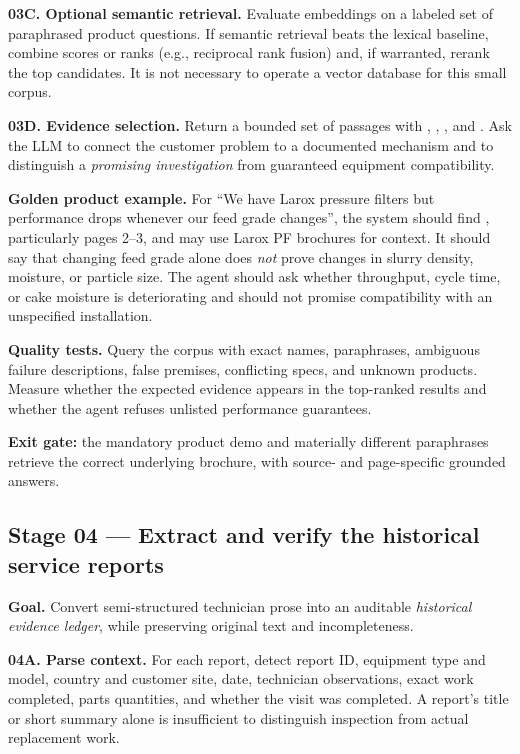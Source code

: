 \documentclass[11pt,a4paper]{article}
\DeclareRobustCommand{\code}[1]{{\ttfamily\small\detokenize{#1}}}
\begin{document}
\textbf{03C. Optional semantic retrieval.} Evaluate embeddings on a labeled set of paraphrased product questions. If semantic retrieval beats the lexical baseline, combine scores or ranks (e.g., reciprocal rank fusion) and, if warranted, rerank the top candidates. It is not necessary to operate a vector database for this small corpus.

\textbf{03D. Evidence selection.} Return a bounded set of passages with \code{source}, \code{page}, \code{score}, and \code{excerpt}. Ask the LLM to connect the customer problem to a documented mechanism and to distinguish a \emph{promising investigation} from guaranteed equipment compatibility.

\begin{keybox}
\textbf{Golden product example.} For ``We have Larox pressure filters but performance drops whenever our feed grade changes'', the system should find \code{filter-optimizer.md}, particularly pages 2--3, and may use Larox PF brochures for context. It should say that changing feed grade alone does \emph{not} prove changes in slurry density, moisture, or particle size. The agent should ask whether throughput, cycle time, or cake moisture is deteriorating and should not promise compatibility with an unspecified installation.
\end{keybox}

\textbf{Quality tests.} Query the corpus with exact names, paraphrases, ambiguous failure descriptions, false premises, conflicting specs, and unknown products. Measure whether the expected evidence appears in the top-ranked results and whether the agent refuses unlisted performance guarantees.

\textbf{Exit gate:} the mandatory product demo and materially different paraphrases retrieve the correct underlying brochure, with source- and page-specific grounded answers.

\subsection{Stage 04 --- Extract and verify the historical service reports}
\textbf{Goal.} Convert semi-structured technician prose into an auditable \emph{historical evidence ledger}, while preserving original text and incompleteness.

\textbf{04A. Parse context.} For each report, detect report ID, equipment type and model, country and customer site, date, technician observations, exact work completed, parts quantities, and whether the visit was completed. A report's title or short summary alone is insufficient to distinguish inspection from actual replacement work.
\end{document}
